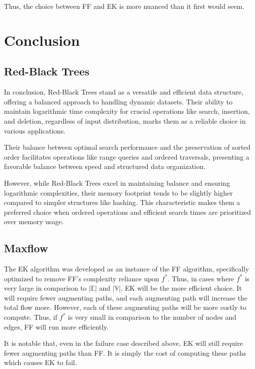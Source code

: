 \documentclass[12pt]{amsart}
\begin{document}
    Thus, the choice between FF and EK is more nuanced than it
    first would seem.

\section{Conclusion}

\subsection{Red-Black Trees}
    
    In conclusion, Red-Black Trees stand as a versatile and efficient data structure,
    offering a balanced approach to handling dynamic datasets. Their ability to 
    maintain logarithmic time complexity for crucial operations like search, 
    insertion, and deletion, regardless of input distribution, marks them as a 
    reliable choice in various applications.

    Their balance between optimal search performance and the preservation of sorted 
    order facilitates operations like range queries and ordered traversals, presenting
    a favorable balance between speed and structured data organization.

    However, while Red-Black Trees excel in maintaining balance and ensuring 
    logarithmic complexities, their memory footprint tends to be slightly higher 
    compared to simpler structures like hashing. This characteristic makes them a 
    preferred choice when ordered operations and efficient search times are 
    prioritized over memory usage.

\subsection{Maxflow}

    The EK algorithm was developed as an instance of the FF
    algorithm, specifically optimized to remove FF's complexity
    reliance upon $f^*$. Thus, in cases where $f^*$ is very
    large in comparison to $\vert \mathbb{E} \vert$ and
    $\vert \mathbb{V} \vert$, EK will be the more efficient
    choice. It will require fewer augmenting paths, and each
    augmenting path will increase the total flow more. However,
    each of these augmenting paths will be more costly to
    compute. Thus, if $f^*$ is very small in comparison to the
    number of nodes and edges, FF will run more efficiently.

    It is notable that, even in the failure case described
    above, EK will still require fewer augmenting paths than FF.
    It is simply the cost of computing these paths which causes
    EK to fail.
\end{document}
